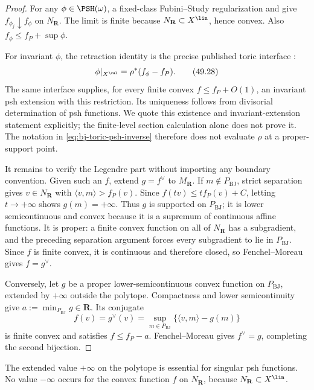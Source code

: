 \begin{proof}
For any $\phi\in\PSH(\omega)$, a fixed-class Fubini--Study
regularization and  give
$f_{\phi_j}\downarrow f_\phi$ on $N_{\mathbf R}$.
The limit is finite because $N_{\mathbf R}\subset X^{\lin}$,
hence convex.  Also $f_\phi\le f_P+\sup\phi$.

For invariant $\phi$, the retraction identity is the precise
published toric interface \cite[Appendix~B, p.~830]{BJ22}:
\[
 \phi|_{X^{\val}}=\rho^*(f_\phi-f_P).
 \tag{49.28}\label{eq:bj-toric-retraction-identity}
\]
The same interface supplies, for every finite convex
$f\le f_P+O(1)$, an invariant psh extension with this restriction.
Its uniqueness follows from divisorial determination of psh functions.
We quote this existence and invariant-extension statement explicitly;
the finite-level section calculation alone does not prove it.
The notation in \eqref{eq:bj-toric-psh-inverse} therefore does not
evaluate $\rho$ at a proper-support point.

It remains to verify the Legendre part without importing any boundary
convention.  Given such an $f$, extend $g=f^\vee$ to
$M_{\mathbf R}$.  If $m\notin P_{\mathrm{BJ}}$, strict separation gives
$v\in N_{\mathbf R}$ with
$\langle v,m\rangle>f_P(v)$.  Since
$f(tv)\leq t f_P(v)+C$, letting $t\to+\infty$ shows
$g(m)=+\infty$.  Thus $g$ is supported on
$P_{\mathrm{BJ}}$; it is lower semicontinuous and convex because it is a
supremum of continuous affine functions.  It is proper: a finite convex
function on all of $N_{\mathbf R}$ has a subgradient, and the preceding
separation argument forces every subgradient to lie in
$P_{\mathrm{BJ}}$.  Since $f$ is finite convex, it is continuous and
therefore closed, so Fenchel--Moreau gives $f=g^\vee$.

Conversely, let $g$ be a proper lower-semicontinuous convex function on
$P_{\mathrm{BJ}}$, extended by $+\infty$ outside the polytope.  Compactness
and lower semicontinuity give
$a:=\min_{P_{\mathrm{BJ}}}g\in\mathbf R$.  Its conjugate
\[
                  f(v)=g^\vee(v)
                     =\sup_{m\in P_{\mathrm{BJ}}}
                        \{\langle v,m\rangle-g(m)\}
\]
is finite convex and satisfies $f\leq f_P-a$.  Fenchel--Moreau gives
$f^\vee=g$, completing the second bijection.
\end{proof}

The extended value $+\infty$ on the polytope is essential for singular
psh functions.  No value $-\infty$ occurs for the convex function $f$
on $N_{\mathbf R}$, because $N_{\mathbf R}\subset X^{\lin}$.

